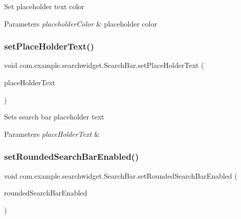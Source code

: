 Set placeholder text color


\begin{DoxyParams}{Parameters}
{\em placeholder\+Color} & placeholder color \\
\hline
\end{DoxyParams}
\mbox{\label{classcom_1_1example_1_1searchwidget_1_1_search_bar_a27d40730d4d6a78b9ee89a8c33120d13}} 
\subsubsection{\texorpdfstring{setPlaceHolderText()}{setPlaceHolderText()}}
{\footnotesize\ttfamily void com.\+example.\+searchwidget.\+Search\+Bar.\+set\+Place\+Holder\+Text (\begin{DoxyParamCaption}\item[{Char\+Sequence}]{place\+Holder\+Text }\end{DoxyParamCaption})}

Sets search bar placeholder text


\begin{DoxyParams}{Parameters}
{\em place\+Holder\+Text} & \\
\hline
\end{DoxyParams}
\mbox{\label{classcom_1_1example_1_1searchwidget_1_1_search_bar_af2188426a0fd543d09dfcc0042c9cee9}} 
\subsubsection{\texorpdfstring{setRoundedSearchBarEnabled()}{setRoundedSearchBarEnabled()}}
{\footnotesize\ttfamily void com.\+example.\+searchwidget.\+Search\+Bar.\+set\+Rounded\+Search\+Bar\+Enabled (\begin{DoxyParamCaption}\item[{boolean}]{rounded\+Search\+Bar\+Enabled }\end{DoxyParamCaption})}

